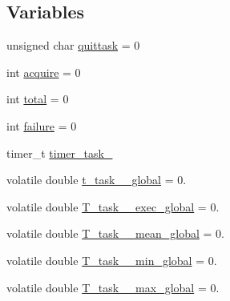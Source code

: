 \subsection*{Variables}
\begin{DoxyCompactItemize}
\item 
unsigned char \hyperlink{main2_01_07C_xC3_xB3pia_01em_01conflito_01de_01Caio_01Gustavo_01Mesquita_01Angelo_012013-05-17_08_8c_a525dcecf4685bea1fbf92651ac0401fe}{quittask} = 0
\item 
int \hyperlink{main2_01_07C_xC3_xB3pia_01em_01conflito_01de_01Caio_01Gustavo_01Mesquita_01Angelo_012013-05-17_08_8c_a95a859aa805a58cd4c59e172d250de4a}{acquire} = 0
\item 
int \hyperlink{main2_01_07C_xC3_xB3pia_01em_01conflito_01de_01Caio_01Gustavo_01Mesquita_01Angelo_012013-05-17_08_8c_ac7af894858cf396a219d632f40afdc8d}{total} = 0
\item 
int \hyperlink{main2_01_07C_xC3_xB3pia_01em_01conflito_01de_01Caio_01Gustavo_01Mesquita_01Angelo_012013-05-17_08_8c_a4f35e5ea2395561d0bd3b2f45612dc2c}{failure} = 0
\item 
timer\-\_\-t \hyperlink{main2_01_07C_xC3_xB3pia_01em_01conflito_01de_01Caio_01Gustavo_01Mesquita_01Angelo_012013-05-17_08_8c_a904a157c5d5f94416cd450f511635af1}{timer\-\_\-task\-\_}
\item 
volatile double \hyperlink{main2_01_07C_xC3_xB3pia_01em_01conflito_01de_01Caio_01Gustavo_01Mesquita_01Angelo_012013-05-17_08_8c_a2a2a647912528f7aa86812528dbfe02f}{t\-\_\-task\-\_\-\_\-global} = 0.
\item 
volatile double \hyperlink{main2_01_07C_xC3_xB3pia_01em_01conflito_01de_01Caio_01Gustavo_01Mesquita_01Angelo_012013-05-17_08_8c_acdaa4a9b0e1be3dfa53b52df6410ad3b}{T\-\_\-task\-\_\-\_\-exec\-\_\-global} = 0.
\item 
volatile double \hyperlink{main2_01_07C_xC3_xB3pia_01em_01conflito_01de_01Caio_01Gustavo_01Mesquita_01Angelo_012013-05-17_08_8c_a738c330c86a365e72ce29ebca3f1e572}{T\-\_\-task\-\_\-\_\-mean\-\_\-global} = 0.
\item 
volatile double \hyperlink{main2_01_07C_xC3_xB3pia_01em_01conflito_01de_01Caio_01Gustavo_01Mesquita_01Angelo_012013-05-17_08_8c_a86222e255aeeb47598a4fc91ab6c2b1a}{T\-\_\-task\-\_\-\_\-min\-\_\-global} = 0.
\item 
volatile double \hyperlink{main2_01_07C_xC3_xB3pia_01em_01conflito_01de_01Caio_01Gustavo_01Mesquita_01Angelo_012013-05-17_08_8c_aa714e30d738039b5bf665742beb31739}{T\-\_\-task\-\_\-\_\-max\-\_\-global} = 0.

\end{DoxyCompactItemize}
